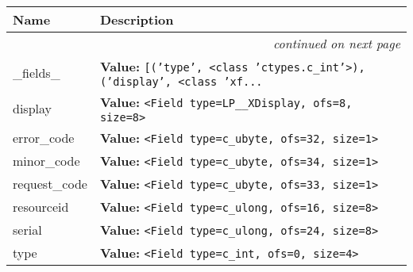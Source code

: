     \vspace{-1cm}
\hspace{\varindent}\begin{longtable}{|p{\varnamewidth}|p{\vardescrwidth}|l}
\cline{1-2}
\cline{1-2} \centering \textbf{Name} & \centering \textbf{Description}& \\
\cline{1-2}
\endhead\cline{1-2}\multicolumn{3}{r}{\small\textit{continued on next page}}\\\endfoot\cline{1-2}
\endlastfoot\raggedright \_\-f\-i\-e\-l\-d\-s\-\_\- & \raggedright \textbf{Value:} 
{\tt \texttt{[}\texttt{(}\texttt{'}\texttt{type}\texttt{'}\texttt{, }{\textless}class 'ctypes.c\_int'{\textgreater}\texttt{)}\texttt{, }\texttt{(}\texttt{'}\texttt{display}\texttt{'}\texttt{, }{\textless}class 'xf\texttt{...}}&\\
\cline{1-2}
\raggedright d\-i\-s\-p\-l\-a\-y\- & \raggedright \textbf{Value:} 
{\tt {\textless}Field type=LP\_\_XDisplay, ofs=8, size=8{\textgreater}}&\\
\cline{1-2}
\raggedright e\-r\-r\-o\-r\-\_\-c\-o\-d\-e\- & \raggedright \textbf{Value:} 
{\tt {\textless}Field type=c\_ubyte, ofs=32, size=1{\textgreater}}&\\
\cline{1-2}
\raggedright m\-i\-n\-o\-r\-\_\-c\-o\-d\-e\- & \raggedright \textbf{Value:} 
{\tt {\textless}Field type=c\_ubyte, ofs=34, size=1{\textgreater}}&\\
\cline{1-2}
\raggedright r\-e\-q\-u\-e\-s\-t\-\_\-c\-o\-d\-e\- & \raggedright \textbf{Value:} 
{\tt {\textless}Field type=c\_ubyte, ofs=33, size=1{\textgreater}}&\\
\cline{1-2}
\raggedright r\-e\-s\-o\-u\-r\-c\-e\-i\-d\- & \raggedright \textbf{Value:} 
{\tt {\textless}Field type=c\_ulong, ofs=16, size=8{\textgreater}}&\\
\cline{1-2}
\raggedright s\-e\-r\-i\-a\-l\- & \raggedright \textbf{Value:} 
{\tt {\textless}Field type=c\_ulong, ofs=24, size=8{\textgreater}}&\\
\cline{1-2}
\raggedright t\-y\-p\-e\- & \raggedright \textbf{Value:} 
{\tt {\textless}Field type=c\_int, ofs=0, size=4{\textgreater}}&\\
\cline{1-2}
\end{longtable}



